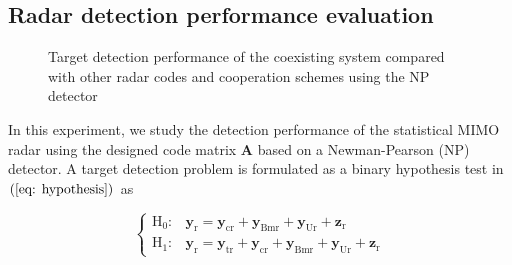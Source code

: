 \documentclass[9pt,journal]{IEEEtran}
\newcommand{\paren}[1]{\left({#1}\right)}
\begin{document}
\fi
\vspace{-1em}
\subsection{Radar detection performance evaluation}
\begin{figure}[t]
\vspace{-1em}
\centering
{}
\hfil
{}
\caption{Target detection performance of the coexisting system compared with other radar codes and cooperation schemes using the NP detector}
\label{fig: NPdetector}
\vspace{-1em}
\end{figure}
In this experiment, we study the detection performance of the statistical MIMO radar using the designed code matrix $\mathbf{A}$ based on a Newman-Pearson (NP) detector. A target detection problem is formulated as a binary hypothesis test in $\paren{\ref{eq: hypothesis}}$ as
\par\noindent\small
\begin{equation}
\label{eq: hypothesis}
\begin{cases}
\mathrm{H}_{\mathrm{0}}: & \mathbf{y}_{\textrm{r}} = \mathbf{y}_{\textrm{cr}}+\mathbf{y}_{\textrm{Bmr}}+\mathbf{y}_{\textrm{Ur}}+\mathbf{z}_{\textrm{r}}
\\
\mathrm{H}_{\mathrm{1}}: & \mathbf{y}_{\mathrm{r}} = \mathbf{y}_{\textrm{tr}}+ \mathbf{y}_{\textrm{cr}}+\mathbf{y}_{\textrm{Bmr}}+\mathbf{y}_{\textrm{Ur}}+\mathbf{z}_{\textrm{r}}
\end{cases}
\end{equation}
\end{document}
